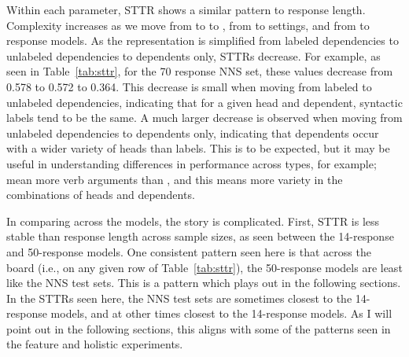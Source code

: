 Within each parameter, STTR shows a similar pattern to response length. Complexity increases as we move from  to  to , from  to  settings, and from  to  response models. As the representation is simplified from labeled dependencies to unlabeled dependencies to dependents only, STTRs decrease. 
For example, as seen in Table~\ref{tab:sttr}, for the 70 response NNS set, these values decrease from 0.578 to 0.572 to 0.364.
This decrease is small when moving from labeled to unlabeled dependencies, indicating that for a given head and dependent, syntactic labels tend to be the same. A much larger decrease is observed when moving from unlabeled dependencies to dependents only, indicating that dependents occur with a wider variety of heads than labels. This is to be expected, but it may be useful in understanding differences in performance across  types, for example;  mean more verb arguments than , and this means more variety in the combinations of heads and dependents.

In comparing across the models, the story is complicated. First, STTR is less stable than response length across sample sizes, as seen between the 14-response and 50-response  models. One consistent pattern seen here is that across the board (i.e., on any given row of Table~\ref{tab:sttr}), the 50-response  models are least like the NNS test sets. This is a pattern which plays out in the following sections. In the STTRs seen here, the NNS test sets are sometimes closest to the 14-response  models, and at other times closest to the 14-response  models. As I will point out in the following sections, this aligns with some of the patterns seen in the feature and holistic experiments.

